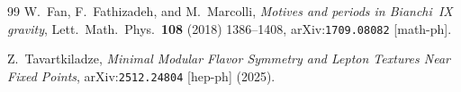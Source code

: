 \documentclass[a4paper,11pt]{article}
\theoremstyle{definition}
\theoremstyle{remark}
\begin{document}
\begin{thebibliography}{99}
W.~Fan, F.~Fathizadeh, and M.~Marcolli,
\emph{Motives and periods in Bianchi~IX gravity},
Lett.~Math.~Phys.~\textbf{108} (2018) 1386--1408,
arXiv:\texttt{1709.08082} [math-ph].

Z.~Tavartkiladze,
\emph{Minimal Modular Flavor Symmetry and Lepton Textures Near Fixed Points},
arXiv:\texttt{2512.24804} [hep-ph] (2025).

\end{thebibliography}
\end{document}
